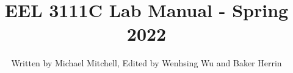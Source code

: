 \documentclass[letterpaper,oneside,12pt]{report}
\begin{document}
\pagestyle{empty} %



\title{EEL 3111C Lab Manual - Spring 2022}
\author{Written by Michael Mitchell,
Edited by Wenhsing Wu and Baker Herrin}
\maketitle
\addtocounter{page}{1}


\tableofcontents %
\cleardoublepage %

\pagestyle{plain} %






\setcounter{chapter}{-1}















\end{document}
